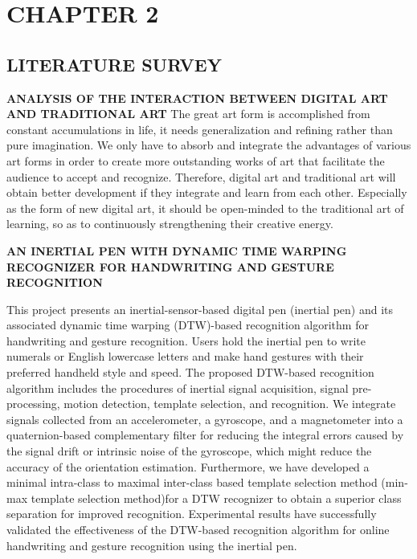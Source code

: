 
\chapter{CHAPTER 2}




\section{LITERATURE SURVEY}

\textbf{ANALYSIS OF THE INTERACTION BETWEEN DIGITAL ART AND TRADITIONAL ART}
The great art form is accomplished from constant accumulations in life, it needs generalization and refining rather than pure imagination. We only have to absorb and integrate the advantages of various art forms in order to create more outstanding works of art that facilitate the audience to accept and recognize. Therefore, digital art and traditional art will obtain better development if they integrate and learn from each other. Especially as the form of new digital art, it should be open-minded to the traditional art of learning, so as to continuously strengthening their creative energy.

\textbf{AN INERTIAL PEN WITH DYNAMIC TIME WARPING RECOGNIZER FOR HANDWRITING AND GESTURE RECOGNITION}

This project presents an inertial-sensor-based digital pen (inertial pen) and its associated dynamic time warping (DTW)-based recognition algorithm for handwriting and gesture recognition. Users hold the inertial pen to write numerals or English lowercase letters and make hand gestures with their preferred handheld style and speed. The proposed DTW-based recognition algorithm includes the procedures of inertial signal acquisition, signal pre-processing, motion detection, template selection, and recognition. We integrate signals collected from an accelerometer, a gyroscope, and a magnetometer into a quaternion-based complementary filter for reducing the integral errors caused by the signal drift or intrinsic noise of the gyroscope, which might reduce the accuracy of the orientation estimation. Furthermore, we have developed a minimal intra-class to maximal inter-class based template selection method (min-max template selection method)for a DTW recognizer to obtain a superior class separation for improved recognition. Experimental results have successfully validated the effectiveness of the DTW-based recognition algorithm for online handwriting and gesture recognition using the inertial pen. 




